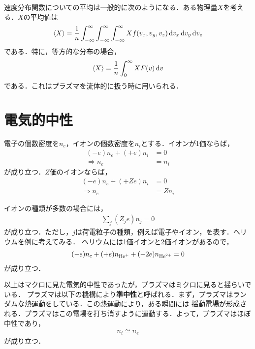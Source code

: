 \documentclass{report}
\begin{document}
速度分布関数についての平均は一般的に次のようになる．ある物理量$X$を考える．$X$の平均値は
\begin{align}
  \ev{X} = \frac{1}{n}\int_{-\infty}^{\infty} \int_{-\infty}^{\infty} \int_{-\infty}^{\infty} Xf(v_x,v_y,v_z) \dd{v_x}\dd{v_y}\dd{v_z}
\end{align}
である．特に，等方的な分布の場合，
\begin{align}
  \ev{X} = \frac{1}{n} \int_{0}^{\infty} XF(v) \dd{v}
\end{align}
である．これはプラズマを流体的に扱う時に用いられる．

\section{電気的中性}
電子の個数密度を$n_e$，イオンの個数密度を$n_i$とする．イオンが1価ならば，
\begin{align}
  (-e)n_e + (+e)n_i &= 0\\
  \Rightarrow n_e &= n_i
\end{align}
が成り立つ．$Z$価のイオンならば，
\begin{align}
  (-e)n_e + (+Ze)n_i &= 0\\
  \Rightarrow n_e &= Zn_i
\end{align}

イオンの種類が多数の場合には，
\begin{align}
  \sum_{j} (Z_j e)n_j = 0
\end{align}
が成り立つ．ただし，$j$は荷電粒子の種類，例えば電子やイオン，を表す．ヘリウムを例に考えてみる．
ヘリウムには1価イオンと2価イオンがあるので，
\begin{align}
  (-e)n_e + (+e)n_{\mathrm{He}^{+}} + (+2e)n_{\mathrm{He}^{2+}} = 0
\end{align}
が成り立つ．

以上はマクロに見た電気的中性であったが，プラズマはミクロに見ると揺らいでいる．
プラズマは以下の機構により\textbf{準中性}と呼ばれる．まず，プラズマはランダムな熱運動をしている．この熱運動により，ある瞬間には
揺動電場が形成される．プラズマはこの電場を打ち消すように運動する．よって，プラズマはほぼ中性であり，
\begin{align}
  n_i \simeq n_e
\end{align}
が成り立つ．
\end{document}
